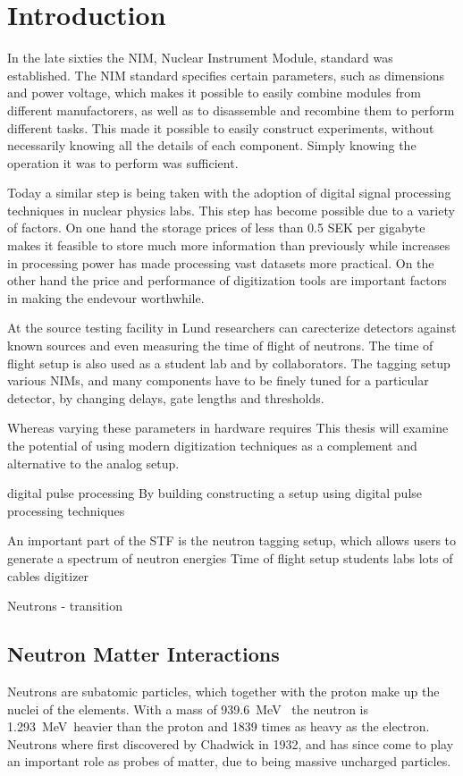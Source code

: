\documentclass[main.tex]{subfiles}
\begin{document}
\chapter{Introduction}
In the late sixties the NIM, Nuclear Instrument Module, standard was established. The NIM standard specifies certain parameters, such as dimensions and power voltage, which makes it possible to easily combine modules from different manufactorers, as well as to disassemble and recombine them to perform different tasks. This made it possible to easily construct experiments, without necessarily knowing all the details of each component. Simply knowing the operation it was to perform was sufficient.

Today a similar step is being taken with the adoption of digital signal processing techniques in nuclear physics labs. This step has become possible due to a variety of factors. On one hand the storage prices of less than 0.5 SEK per gigabyte makes it feasible to store much more information than previously while increases in processing power has made processing vast datasets more practical. On the other hand the price and performance of digitization tools are important factors in making the endevour worthwhile.

At the source testing facility in Lund researchers can carecterize detectors against known sources and even measuring the time of flight of neutrons. The time of flight setup is also used as a student lab and by collaborators. The tagging setup various NIMs, and many components have to be finely tuned for a particular detector, by changing delays, gate lengths and thresholds. 

Whereas varying these parameters in hardware requires
This thesis will examine the potential of using modern digitization techniques as a complement and alternative to the analog setup. 

digital pulse processing By building constructing a setup using digital pulse processing techniques 

 An important part of the STF is the neutron tagging setup, which allows users to generate a spectrum of neutron energies
Time of flight setup
students labs
lots of cables
digitizer

Neutrons - transition

\section{Neutron Matter Interactions}\label{sec:neutronMatterInteractions}
Neutrons are subatomic particles, which together with the proton make up the nuclei of the elements. With a mass of \SI{939.6}{\MeV\;} the neutron is \SI{1.293}{\MeV\;}heavier than the proton and 1839 times as heavy as the electron. Neutrons where first discovered by Chadwick in 1932, and has since come to play an important role as probes of matter, due to being massive uncharged particles.
\end{document}
